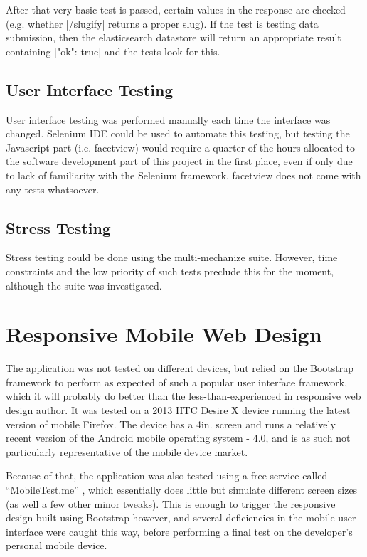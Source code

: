After that very basic test is passed, certain values in the response are checked (e.g. whether |/slugify| returns a proper slug). If the test is testing data submission, then the elasticsearch datastore will return an appropriate result containing |"ok": true| and the tests look for this.

\subsection{User Interface Testing}
User interface testing was performed manually each time the interface was changed. Selenium IDE \cite{selenium} could be used to automate this testing, but testing the Javascript part (i.e. facetview) would require a quarter of the hours allocated to the software development part of this project in the first place, even if only due to lack of familiarity with the Selenium framework. facetview does not come with any tests whatsoever.

\subsection{Stress Testing}
Stress testing could be done using the multi-mechanize \cite{multi-mechanize} suite. However, time constraints and the low priority of such tests preclude this for the moment, although the suite was investigated.

\section{Responsive Mobile Web Design}
\label{testing-mobile}
The application was not tested on different devices, but relied on the Bootstrap framework to perform as expected of such a popular user interface framework, which it will probably do better than the less-than-experienced in responsive web design author. It was tested on a 2013 HTC Desire X device running the latest version of mobile Firefox. The device has a 4in. screen and runs a relatively recent version of the Android mobile operating system - 4.0, and is as such not particularly representative of the mobile device market.

Because of that, the application was also tested using a free service called ``MobileTest.me'' \cite{mobiletestme}, which essentially does little but simulate different screen sizes (as well a few other minor tweaks). This is enough to trigger the responsive design built using Bootstrap however, and several deficiencies in the mobile user interface were caught this way, before performing a final test on the developer's personal mobile device.